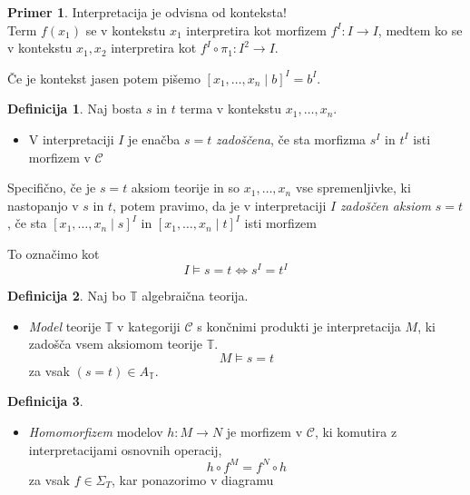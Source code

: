 \documentclass[12pt,a4paper]{book}
\theoremstyle{definition}
\newtheorem{definicija}{Definicija}[chapter]
\theoremstyle{plain}
\theoremstyle{definition}
\newtheorem{primer}{Primer}[section]
\theoremstyle{remark}
\begin{document}
%
\begin{primer}
Interpretacija je odvisna od konteksta!\\
Term $f(x_1)$ se v kontekstu $x_1$ interpretira kot morfizem $f^I : I \to I$, medtem ko se v kontekstu $x_1, x_2$ interpretira kot $f^I \circ \pi_1 : I^2 \to I$.
\end{primer}
\vspace{1cm}
Če je kontekst jasen potem pišemo $[x_1, \ldots, x_n \mid b]^I = b^I$.
%
\begin{definicija}
Naj bosta $s$ in $t$ terma v kontekstu $x_1, \ldots, x_n$. 
\begin{itemize}
\item V interpretaciji $I$ je enačba $s = t$ \emph{zadoščena}, če sta morfizma $s^I$ in $t^I$ isti morfizem v $\mathcal{C}$
\end{itemize}
%
Specifično, če je $s = t$ aksiom teorije in so $x_1, \ldots, x_n$ vse spremenljivke, ki nastopanjo v $s$ in $t$, potem pravimo, da je v interpretaciji $I$ \emph{zadoščen aksiom} $s = t$, če sta $[x_1, \ldots, x_n \mid s]^I$ in $[x_1, \ldots, x_n \mid t]^I$ isti morfizem
\begin{center}
\end{center}
%
To označimo kot
$$I \models s = t \Longleftrightarrow s^I = t^I$$
\end{definicija}
%
\begin{definicija}
Naj bo $\mathbb{T}$ algebraična teorija. 
\begin{itemize}
%
\item \emph{Model} teorije $\mathbb{T}$ v kategoriji $\mathcal{C}$ s končnimi produkti je interpretacija $M$, ki zadošča vsem aksiomom teorije $\mathbb{T}$.
$$M \models s = t$$ za vsak $(s = t) \in A_\mathbb{T}$.
\end{itemize}
\end{definicija}
%
\begin{definicija}
\begin{itemize}
\item \emph{Homomorfizem} modelov $h : M \to N$ je morfizem v $\mathcal{C}$, ki komutira z interpretacijami osnovnih operacij,
$$h \circ f^M = f^N \circ h$$
za vsak $f \in \Sigma_T$, kar ponazorimo v diagramu
\begin{center}
\end{center}
\end{itemize}
\end{definicija}
\end{document}
